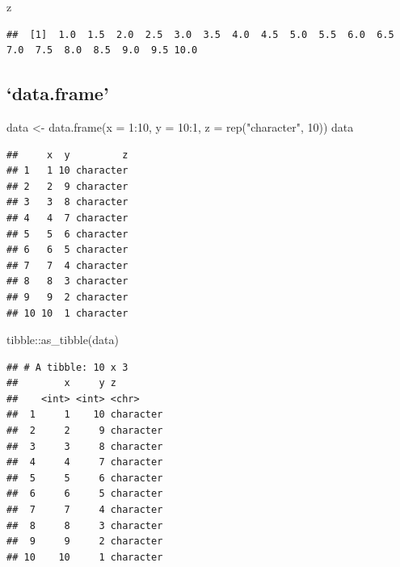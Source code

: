 \documentclass[
]{article}
\newenvironment{Shaded}{\begin{snugshade}}{\end{snugshade}}
\newcommand{\AttributeTok}[1]{\textcolor[rgb]{0.77,0.63,0.00}{#1}}
\newcommand{\DecValTok}[1]{\textcolor[rgb]{0.00,0.00,0.81}{#1}}
\newcommand{\FunctionTok}[1]{\textcolor[rgb]{0.00,0.00,0.00}{#1}}
\newcommand{\NormalTok}[1]{#1}
\newcommand{\OtherTok}[1]{\textcolor[rgb]{0.56,0.35,0.01}{#1}}
\newcommand{\SpecialCharTok}[1]{\textcolor[rgb]{0.00,0.00,0.00}{#1}}
\newcommand{\StringTok}[1]{\textcolor[rgb]{0.31,0.60,0.02}{#1}}
\begin{document}
\begin{Shaded}
\begin{Highlighting}[]
\NormalTok{z}
\end{Highlighting}
\end{Shaded}

\begin{verbatim}
##  [1]  1.0  1.5  2.0  2.5  3.0  3.5  4.0  4.5  5.0  5.5  6.0  6.5  7.0  7.5  8.0  8.5  9.0  9.5 10.0
\end{verbatim}

\hypertarget{data.frame}{%
\subsection{`data.frame'}\label{data.frame}}

\begin{Shaded}
\begin{Highlighting}[]
\NormalTok{data }\OtherTok{\textless{}{-}} \FunctionTok{data.frame}\NormalTok{(}\AttributeTok{x =} \DecValTok{1}\SpecialCharTok{:}\DecValTok{10}\NormalTok{, }\AttributeTok{y =} \DecValTok{10}\SpecialCharTok{:}\DecValTok{1}\NormalTok{, }\AttributeTok{z =} \FunctionTok{rep}\NormalTok{(}\StringTok{"character"}\NormalTok{, }\DecValTok{10}\NormalTok{))}
\NormalTok{data}
\end{Highlighting}
\end{Shaded}

\begin{verbatim}
##     x  y         z
## 1   1 10 character
## 2   2  9 character
## 3   3  8 character
## 4   4  7 character
## 5   5  6 character
## 6   6  5 character
## 7   7  4 character
## 8   8  3 character
## 9   9  2 character
## 10 10  1 character
\end{verbatim}

\begin{Shaded}
\begin{Highlighting}[]
\NormalTok{tibble}\SpecialCharTok{::}\FunctionTok{as\_tibble}\NormalTok{(data)}
\end{Highlighting}
\end{Shaded}

\begin{verbatim}
## # A tibble: 10 x 3
##        x     y z        
##    <int> <int> <chr>    
##  1     1    10 character
##  2     2     9 character
##  3     3     8 character
##  4     4     7 character
##  5     5     6 character
##  6     6     5 character
##  7     7     4 character
##  8     8     3 character
##  9     9     2 character
## 10    10     1 character
\end{verbatim}
\end{document}

